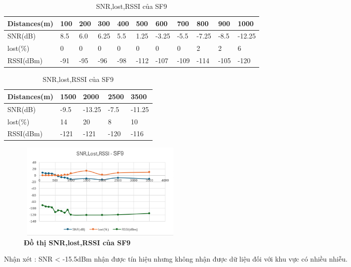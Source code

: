 \documentclass{article} %
\begin{document}
	\begin{table}[H]
		\centering
		\begin{tabular}{|l|l|l|l|l|l|l|l|l|l|l|}
			\hline
			\textbf{Distances(m)} & \textbf{100} & \textbf{200} & \textbf{300} & \textbf{400} & \textbf{500} & \textbf{600} & \textbf{700} & \textbf{800} & \textbf{900} & \textbf{1000} \\ \hline
			SNR(dB)      & 8.5          & 6.0          & 6.25         & 5.5          & 1.25         & -3.25        & -5.5         & -7.25        & -8.5         & -12.25        \\ \hline
			lost(\%)     & 0         & 0        & 0         & 0         & 0         & 0         & 0        & 2         & 2         & 6          \\ \hline
			RSSI(dBm)    & -91          & -95          & -96          & -98          & -112         & -107         & -109         & -114         & -105         & -120          \\ \hline
		\end{tabular}
		\caption{SNR,lost,RSSI của SF9   }
		\label{SF9}
	\end{table}
	
	\begin{table}[H]
		\centering
		\begin{tabular}{|l|l|l|l|l|}
			\hline
			\textbf{Distances(m)} & \textbf{1500} & \textbf{2000} & \textbf{2500} & \textbf{3500} \\ \hline
			SNR(dB)      & -9.5          & -13.25        & -7.5          & -11.25        \\ \hline
			lost(\%)     & 14          & 20          & 8          & 10          \\ \hline
			RSSI(dBm)    & -121          & -121          & -120          & -116          \\ \hline
		\end{tabular}
		\caption{SNR,lost,RSSI của SF9  }
		\label{SF9_2}
	\end{table}
	
	\begin{figure}[!ht]
		\centering
		\includegraphics[width=8.2cm,height=4.7cm]{Images/sf9.png}
		\caption[ Đồ thị SNR,lost,RSSI của SF9 ]{\bfseries \fontsize{12pt}{0pt}\selectfont  Đồ thị SNR,lost,RSSI của SF9}
		\label{sf9}
	\end{figure}
	\newpage
	Nhận xét : SNR < -15.5dBm nhận được tín hiệu nhưng không nhận được dữ liệu đối với khu vực có nhiều nhiễu.
	
\end{document}
